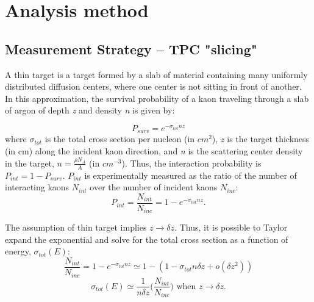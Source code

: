 \section{Analysis method}
\subsection{Measurement Strategy -- TPC "slicing"}
\label{sec:KXSStrategy}
A thin target is a target formed by a slab of material containing many uniformly distributed diffusion centers, where  one center is not sitting in front of another. In this approximation, the survival probability of a kaon traveling through a slab of argon of depth {\it z} and density {\it n} is given by:

\begin{equation}
P_{surv} = e^{-\sigma_{tot}n z}
\end{equation} 
where $\sigma_{tot}$ is the total cross section per nucleon (in $cm^2$), {\emph{z}} is the target thickness (in cm) along the incident kaon direction, and {\emph{n}} is the scattering center density in the target, $n=\frac{\rho N_{A} }{A}$ (in $cm^{-3}$). Thus, the interaction probability is $P_{int} = 1 - P_{surv}$. $P_{int}$ is experimentally measured as the ratio of the number of interacting kaons $N_{int}$ over the number of incident kaons $N_{inc}$:
\begin{equation}
P_{int}=\frac{N_{int}}{N_{inc}}=1-e^{-\sigma_{tot}n z}.
\end{equation}

The assumption of thin target implies $z\rightarrow\delta z$. Thus, it is possible to Taylor expand the exponential and  solve for the total cross section as a function of energy, $\sigma_{tot}(E)$:
\begin{equation}\label{calc_sigma1}
\frac{N_{int}}{N_{inc}}=1-e^{-\sigma_{tot}n z}\simeq 1-(1-\sigma_{tot}n\delta z + o(\delta z^2)) 
\end{equation}
\begin{equation}\label{calc_sigma}
\sigma_{tot}(E) \simeq \frac{1}{n\delta z} \Big(\frac{N_{int}}{N_{inc}}\Big) \text{ 	when $z\rightarrow\delta z$}.
\end{equation}


